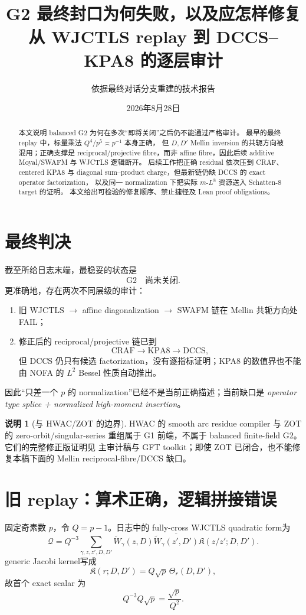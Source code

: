 \documentclass[11pt,a4paper]{ctexart}
\title{G2 最终封口为何失败，以及应怎样修复\\
\large 从 WJCTLS replay 到 DCCS--KPA8 的逐层审计}
\author{依据最终对话分支重建的技术报告}
\date{2026年8月28日}
\theoremstyle{definition}
\newtheorem{remark}[theorem]{说明}
\newcommand{\1}{\mathbf 1}
\newcommand{\FAIL}{\textcolor{red!70!black}{\textsf{FAIL}}}
\begin{document}
\maketitle

\begin{abstract}
本文说明 balanced G2 为何在多次“即将关闭”之后仍不能通过严格审计。
最早的最终 replay 中，标量乘法 $Q^4/p^5\asymp p^{-1}$ 本身正确，
但 $D,D'$ Mellin inversion 的共轭方向被混用；正确支撑是 reciprocal/projective
fibre，而非 affine fibre，因此后续 additive Moyal/SWAFM 与 WJCTLS 逻辑断开。
后续工作把正确 residual 依次压到 CRAF、centered KPA8 与 diagonal
sum--product charge，但最新链仍缺 DCCS 的 exact operator factorization，
以及同一 normalization 下把实际 $m$-$L^8$ 资源送入 Schatten-$8$ target 的证明。
本文给出可检验的修复顺序、禁止捷径及 Lean proof obligations。
\end{abstract}

\section{最终判决}

截至所给日志末端，最稳妥的状态是
\[
\boxed{\mathrm{G2}\quad\textbf{尚未关闭}.}
\]
更准确地，存在两次不同层级的审计：
\begin{enumerate}
\item 旧 WJCTLS $\to$ affine diagonalization $\to$ SWAFM 链在 Mellin
共轭方向处 \FAIL；
\item 修正后的 reciprocal/projective 链已到
\[
\mathrm{CRAF}\to\mathrm{KPA8}\to\mathrm{DCCS},
\]
但 DCCS 仍只有候选 factorization，没有逐指标证明；KPA8 的数值界也不能由
NOFA 的 $L^2$ Bessel 性质自动推出。
\end{enumerate}
因此“只差一个 $p$ 的 normalization”已经不是当前正确描述；当前缺口是
\emph{operator type splice + normalized high-moment insertion}。

\begin{remark}[与 HWAC/ZOT 的边界]
HWAC 的 smooth arc residue compiler 与 ZOT 的 zero-orbit/singular-series
重组属于 G1 前端，不属于 balanced finite-field G2。它们的完整修正版证明见
主审计稿与 GFT toolkit；即使 ZOT 已闭合，也不能修复本稿下面的 Mellin
reciprocal-fibre/DCCS 缺口。
\end{remark}

\section{旧 replay：算术正确，逻辑拼接错误}

固定奇素数 $p$，令 $Q=p-1$。日志中的 fully-cross WJCTLS quadratic form为
\[
\mathcal Q
=Q^{-3}\sum_{\gamma,z,z',D,D'}
\widetilde W_\gamma(z,D)
\overline{\widetilde W_\gamma(z',D')}
\mathfrak K(z/z';D,D').
\tag{2.1}
\]
generic Jacobi kernel写成
\[
\mathfrak K(r;D,D')=Q\sqrt p\,\Theta_r(D,D'),
\]
故首个 exact scalar 为
\[
Q^{-3}Q\sqrt p=\frac{\sqrt p}{Q^2}.
\tag{2.2}
\]
\end{document}
